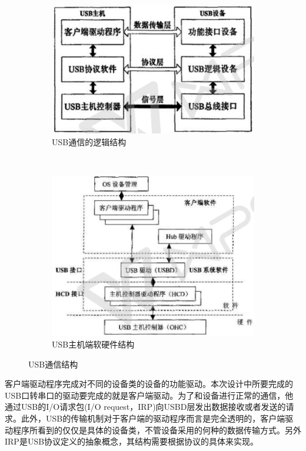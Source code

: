 \begin{figure}[h]
\centering
  \begin{subfigure}[b]{0.4\textwidth}
  \includegraphics[width=1.0\textwidth]{./graphics/USB-device-structure-diagram.pdf}
  \caption{USB通信的逻辑结构}\label{fig:usb通信逻辑结构}
  \end{subfigure}
  ~
  \begin{subfigure}[b]{0.5\textwidth}
  \includegraphics[width=1.0\textwidth]{./graphics/USB-PC-structure.pdf}
  \caption{USB主机端软硬件结构}\label{fig:usb-PC}
  \end{subfigure}
\caption{USB通信结构}\label{fig:USB通信结构}
\end{figure}
	
	客户端驱动程序完成对不同的设备类的设备的功能驱动。本次设计中所要完成的USB口转串口的驱动要完成的就是客户端驱动。为了和设备进行正常的通信，他通过USB的I/O请求包(I/O request，IRP)向USBD层发出数据接收或者发送的请求。此外，USB的传输机制对于客户端的驱动程序而言是完全透明的，客户端驱动程序所看到的仅仅是具体的设备类，不管设备采用的何种的数据传输方式。另外IRP是USB协议定义的抽象概念，其结构需要根据协议的具体来实现。
	
